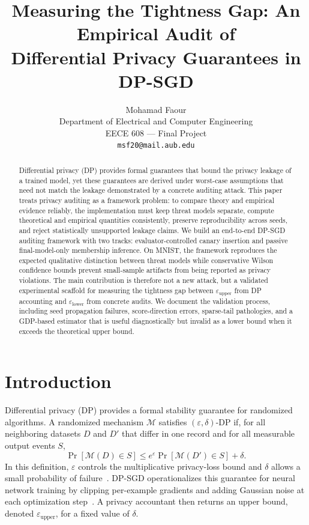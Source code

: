 \documentclass{article}
\title{Measuring the Tightness Gap: An Empirical Audit of\\Differential Privacy Guarantees in DP-SGD}
\author{%
  Mohamad Faour \\
  Department of Electrical and Computer Engineering\\
  EECE 608 --- Final Project\\
  \texttt{msf20@mail.aub.edu} \\
}
\begin{document}
\maketitle

\begin{abstract}
Differential privacy (DP) provides formal guarantees that bound the privacy leakage of a trained model, yet these guarantees are derived under worst-case assumptions that need not match the leakage demonstrated by a concrete auditing attack. This paper treats privacy auditing as a framework problem: to compare theory and empirical evidence reliably, the implementation must keep threat models separate, compute theoretical and empirical quantities consistently, preserve reproducibility across seeds, and reject statistically unsupported leakage claims. We build an end-to-end DP-SGD auditing framework with two tracks: evaluator-controlled canary insertion and passive final-model-only membership inference. On MNIST, the framework reproduces the expected qualitative distinction between threat models while conservative Wilson confidence bounds prevent small-sample artifacts from being reported as privacy violations. The main contribution is therefore not a new attack, but a validated experimental scaffold for measuring the tightness gap between $\varepsilon_{\text{upper}}$ from DP accounting and $\varepsilon_{\text{lower}}$ from concrete audits. We document the validation process, including seed propagation failures, score-direction errors, sparse-tail pathologies, and a GDP-based estimator that is useful diagnostically but invalid as a lower bound when it exceeds the theoretical upper bound.
\end{abstract}

\section{Introduction}

Differential privacy (DP) provides a formal stability guarantee for randomized algorithms. A randomized mechanism $\mathcal{M}$ satisfies $(\varepsilon,\delta)$-DP if, for all neighboring datasets $D$ and $D'$ that differ in one record and for all measurable output events $S$,
\begin{equation}
    \Pr[\mathcal{M}(D) \in S] \leq e^\varepsilon \Pr[\mathcal{M}(D') \in S] + \delta .
\end{equation}
In this definition, $\varepsilon$ controls the multiplicative privacy-loss bound and $\delta$ allows a small probability of failure~\citep{dwork2014algorithmic}. DP-SGD operationalizes this guarantee for neural network training by clipping per-example gradients and adding Gaussian noise at each optimization step~\citep{abadi2016deep}. A privacy accountant then returns an upper bound, denoted $\varepsilon_{\text{upper}}$, for a fixed value of $\delta$.
\end{document}
